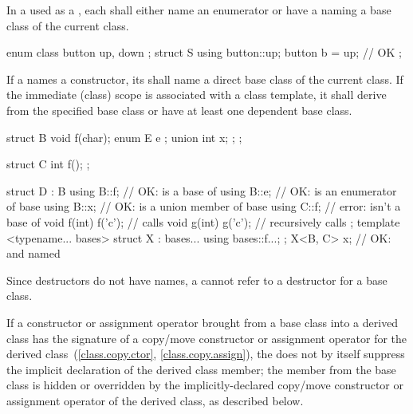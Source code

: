 \pnum
In a  used as a
,
each 
shall either name an enumerator
or have a 
naming a base class of the current class.
\begin{example}
\begin{codeblock}
enum class button { up, down };
struct S {
  using button::up;
  button b = up;                // OK
};
\end{codeblock}
\end{example}
If a
 names a constructor,
its  shall name
a direct base class of the current class.
If the immediate (class) scope is associated with a class template,
it shall derive from the specified base class or
have at least one dependent base class.
\begin{example}
\begin{codeblock}
struct B {
  void f(char);
  enum E { e };
  union { int x; };
};

struct C {
  int f();
};

struct D : B {
  using B::f;                   // OK:  is a base of 
  using B::e;                   // OK:  is an enumerator of base 
  using B::x;                   // OK:  is a union member of base 
  using C::f;                   // error:  isn't a base of 
  void f(int) { f('c'); }       // calls 
  void g(int) { g('c'); }       // recursively calls 
};
template <typename... bases>
struct X : bases... {
  using bases::f...;
};
X<B, C> x;                      // OK:  and  named
\end{codeblock}
\end{example}

\pnum
\begin{note}
Since destructors do not have names, a
 cannot refer to a
destructor for a base class.
\end{note}
If a constructor or assignment operator brought from a base class into a derived class
has the signature of a copy/move constructor or assignment operator
for the derived class~(\ref{class.copy.ctor}, \ref{class.copy.assign}),
the  does not by itself
suppress the implicit declaration of the derived class member;
the member from the base class is hidden or overridden
by the implicitly-declared copy/move constructor or assignment operator
of the derived class, as described below.

